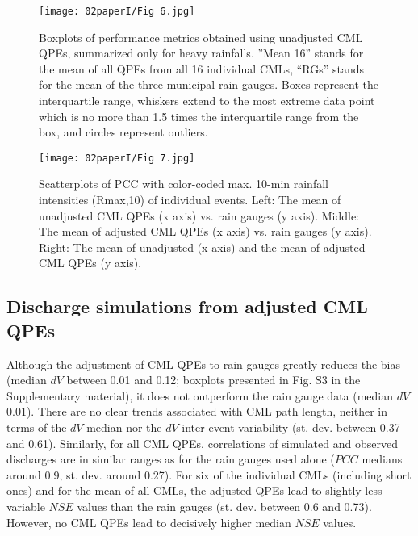 \documentclass{ctuthesis}\usepackage[]{graphicx}\usepackage[]{color}
\begin{document}
\begin{figure}[ph]
\begin{center}
\texttt{[image: 02paperI/Fig 6.jpg]}
\caption{Boxplots of performance metrics obtained using unadjusted CML QPEs, summarized only for heavy rainfalls. ”Mean 16” stands for the mean of all QPEs from all 16 individual CMLs, “RGs” stands for the mean of the three municipal rain gauges. Boxes represent the interquartile range, whiskers extend to the most extreme data point which is no more than 1.5 times the interquartile range from the box, and circles represent outliers.} \label{2fig6}
\end{center}
\end{figure}

\begin{figure}[ph]
\begin{center}
\texttt{[image: 02paperI/Fig 7.jpg]}
\caption{Scatterplots of PCC with color-coded max. 10-min rainfall intensities (Rmax,10) of individual events. Left: The mean of unadjusted CML QPEs (x axis) vs. rain gauges (y axis). Middle: The mean of adjusted CML QPEs (x axis) vs. rain gauges (y axis). Right: The mean of unadjusted (x axis) and the mean of adjusted CML QPEs (y axis).} \label{2fig7}
\end{center}
\end{figure}

\subsection{Discharge simulations from adjusted CML QPEs}

Although the adjustment of CML QPEs to rain gauges greatly reduces the bias (median $dV$ between 0.01 and 0.12; boxplots presented in Fig. S3 in the Supplementary material), it does not outperform the rain gauge data (median $dV$ 0.01). There are no clear trends associated with CML path length, neither in terms of the $dV$ median nor the $dV$ inter-event variability (st. dev. between 0.37 and 0.61). Similarly, for all CML QPEs, correlations of simulated and observed discharges are in similar ranges as for the rain gauges used alone ($PCC$ medians around 0.9, st. dev. around 0.27). For six of the individual CMLs (including short ones) and for the mean of all CMLs, the adjusted QPEs lead to slightly less variable $NSE$ values than the rain gauges (st. dev. between 0.6 and 0.73). However, no CML QPEs lead to decisively higher median $NSE$ values.
\end{document}
